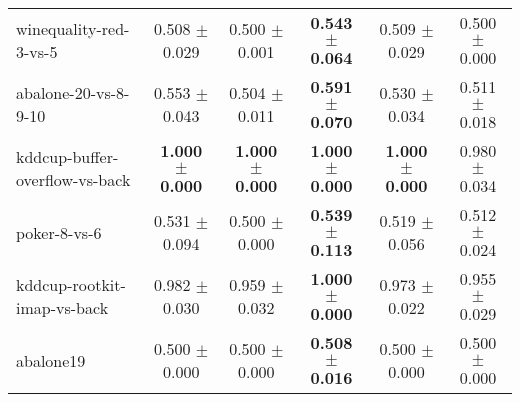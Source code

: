 \begin{table}[!ht]
{\begin{tabular}{l c c c c c}
winequality-red-3-vs-5 & 0.508 $\pm$ 0.029 & 0.500 $\pm$ 0.001 & \textbf{0.543 $\pm$ 0.064} & 0.509 $\pm$ 0.029 & 0.500 $\pm$ 0.000 \\
abalone-20-vs-8-9-10 & 0.553 $\pm$ 0.043 & 0.504 $\pm$ 0.011 & \textbf{0.591 $\pm$ 0.070} & 0.530 $\pm$ 0.034 & 0.511 $\pm$ 0.018 \\
kddcup-buffer-overflow-vs-back & \textbf{1.000 $\pm$ 0.000} & \textbf{1.000 $\pm$ 0.000} & \textbf{1.000 $\pm$ 0.000} & \textbf{1.000 $\pm$ 0.000} & 0.980 $\pm$ 0.034 \\
poker-8-vs-6 & 0.531 $\pm$ 0.094 & 0.500 $\pm$ 0.000 & \textbf{0.539 $\pm$ 0.113} & 0.519 $\pm$ 0.056 & 0.512 $\pm$ 0.024 \\
kddcup-rootkit-imap-vs-back & 0.982 $\pm$ 0.030 & 0.959 $\pm$ 0.032 & \textbf{1.000 $\pm$ 0.000} & 0.973 $\pm$ 0.022 & 0.955 $\pm$ 0.029 \\
abalone19 & 0.500 $\pm$ 0.000 & 0.500 $\pm$ 0.000 & \textbf{0.508 $\pm$ 0.016} & 0.500 $\pm$ 0.000 & 0.500 $\pm$ 0.000 \\
\end{tabular}}
\end{table}
